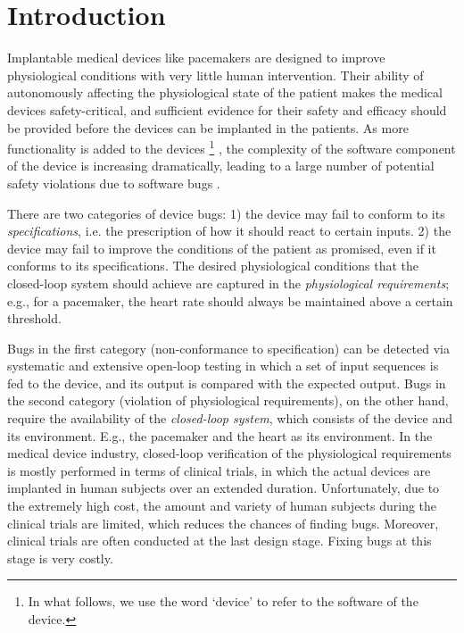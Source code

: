 \section{Introduction}
\label{introduction}

Implantable medical devices like pacemakers are designed to improve physiological conditions with very little human intervention. 
Their ability of autonomously affecting the physiological state of the patient makes the medical devices safety-critical, and sufficient evidence for their safety and efficacy should be provided before the devices can be implanted in the patients. 
As more functionality is added to the devices
\footnote{In what follows, we use the word `device' to refer to the software of the device.}
, the complexity of the software component of the device is increasing dramatically, leading to a large number of potential safety violations due to software bugs \cite{recall_stats}.

There are two categories of device bugs: 
1) the device may fail to conform to its \emph{specifications}, i.e. the prescription of how it should react to certain inputs.  
2) the device may fail to improve the conditions of the patient as promised, even if it conforms to its specifications. 
The desired physiological conditions that the closed-loop system should achieve are captured in the \emph{physiological requirements}; e.g., for a pacemaker, the heart rate should always be maintained above a certain threshold. 

Bugs in the first category (non-conformance to specification) can be detected via systematic and extensive open-loop testing in which a set of input sequences is fed to the device, and its output is compared with the expected output.
Bugs in the second category (violation of physiological requirements), on the other hand, require the availability of the \emph{closed-loop system}, which consists of the device and its environment.
E.g., the pacemaker and the heart as its environment. 
In the medical device industry, closed-loop verification of the physiological requirements is mostly performed in terms of clinical trials, in which the actual devices are implanted in human subjects over an extended duration.
Unfortunately, due to the extremely high cost, the amount and variety of human subjects during the clinical trials are limited, which reduces the chances of finding bugs. 
Moreover, clinical trials are often conducted at the last design stage. Fixing bugs at this stage is very costly.

